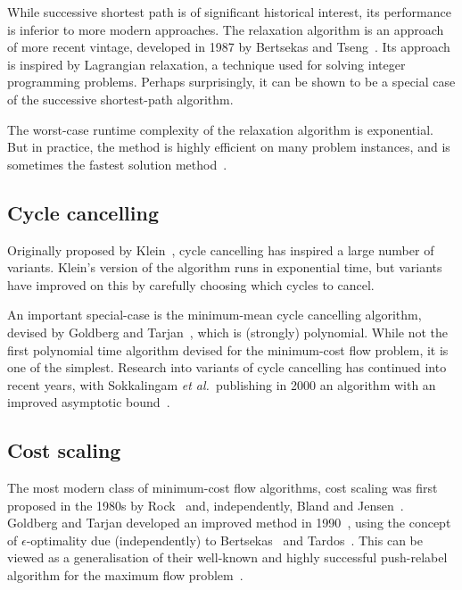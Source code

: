 While successive shortest path is of significant historical interest, its performance is inferior to more modern approaches. The relaxation algorithm is an approach of more recent vintage, developed in 1987 by Bertsekas and Tseng~\cite{BertsekasMethod:1988,BertsekasCodes:1988,BertsekasTseng:94}. Its approach is inspired by Lagrangian relaxation, a technique used for solving integer programming problems. Perhaps surprisingly, it can be shown to be a special case of the successive shortest-path algorithm.

The worst-case runtime complexity of the relaxation algorithm is exponential. But in practice, the method is highly efficient on many problem instances, and is sometimes the fastest solution method~\cite{KiralyKovacs:2012}.

\subsection{Cycle cancelling}

Originally proposed by Klein~\cite{Klein:1967}, cycle cancelling has inspired a large number of variants. Klein's version of the algorithm runs in exponential time, but variants have improved on this by carefully choosing which cycles to cancel.

An important special-case is the minimum-mean cycle cancelling algorithm, devised by Goldberg and Tarjan~\cite{Goldberg:1989}, which is (strongly) polynomial. While not the first polynomial time algorithm devised for the minimum-cost flow problem, it is one of the simplest. Research into variants of cycle cancelling has continued into recent years, with Sokkalingam \textit{et al.}\ publishing in 2000 an algorithm with an improved asymptotic bound~\cite{Sokkalingam:2000}.

\subsection{Cost scaling}

The most modern class of minimum-cost flow algorithms, cost scaling was first proposed in the 1980s by Rock~\cite{Rock:1980} and, independently, Bland and Jensen~\cite{Bland:1985}. Goldberg and Tarjan developed an improved method in 1990~\cite{Goldberg:1990}, using the concept of $\epsilon$-optimality due (independently) to Bertsekas~\cite{Bertsekas:1979} and Tardos~\cite{Tardos:1985}. This can be viewed as a generalisation of their well-known and highly successful push-relabel algorithm for the maximum flow problem~\cite{Goldberg:1988}.

